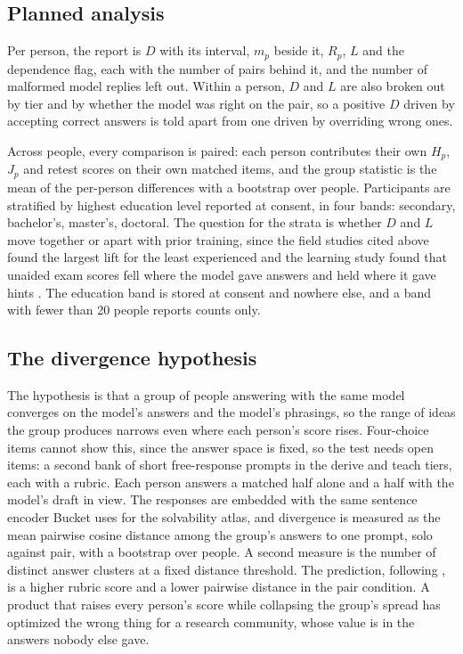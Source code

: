 \documentclass[11pt]{article}
\begin{document}
\subsection{Planned analysis}
\label{sec:analysis}

Per person, the report is $D$ with its interval, $m_p$ beside it, $R_p$, $L$ and the dependence flag, each with the number of pairs behind it, and the number of malformed model replies left out. Within a person, $D$ and $L$ are also broken out by tier and by whether the model was right on the pair, so a positive $D$ driven by accepting correct answers is told apart from one driven by overriding wrong ones.

Across people, every comparison is paired: each person contributes their own $H_p$, $J_p$ and retest scores on their own matched items, and the group statistic is the mean of the per-person differences with a bootstrap over people. Participants are stratified by highest education level reported at consent, in four bands: secondary, bachelor's, master's, doctoral. The question for the strata is whether $D$ and $L$ move together or apart with prior training, since the field studies cited above found the largest lift for the least experienced \autocite{brynjolfsson2023generative} and the learning study found that unaided exam scores fell where the model gave answers and held where it gave hints \autocite{bastani2025guardrails}. The education band is stored at consent and nowhere else, and a band with fewer than 20 people reports counts only.

\subsection{The divergence hypothesis}
\label{sec:divergence}

The hypothesis is that a group of people answering with the same model converges on the model's answers and the model's phrasings, so the range of ideas the group produces narrows even where each person's score rises. Four-choice items cannot show this, since the answer space is fixed, so the test needs open items: a second bank of short free-response prompts in the derive and teach tiers, each with a rubric. Each person answers a matched half alone and a half with the model's draft in view. The responses are embedded with the same sentence encoder Bucket uses for the solvability atlas, and divergence is measured as the mean pairwise cosine distance among the group's answers to one prompt, solo against pair, with a bootstrap over people. A second measure is the number of distinct answer clusters at a fixed distance threshold. The prediction, following \textcite{doshi2024diversity}, is a higher rubric score and a lower pairwise distance in the pair condition. A product that raises every person's score while collapsing the group's spread has optimized the wrong thing for a research community, whose value is in the answers nobody else gave.
\end{document}
